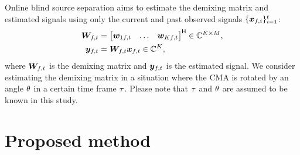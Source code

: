\documentclass[sip,biber]{now-journal}
\begin{document}
Online blind source separation aims to estimate the demixing matrix and estimated signals using only the current and past observed signals $\{\bm{x} _{f,i}\} _{i=1} ^{t}$:
\begin{align}
  \Demix _{\ft} &= \begin{bmatrix} \demix _{1\ft} & \dots & \demix _{\Src\ft} \end{bmatrix} ^{\hermite} \in \C ^{\Src \times \Mic}, \\
  \Est _{\ft} &= \Demix _{\ft} \Obs _{\ft} \in \C ^{\Src},
\end{align}
where $\Demix _{\ft}$ is the demixing matrix and $\Est _{\ft}$ is the estimated signal.
We consider estimating the demixing matrix in a situation where the CMA is rotated by an angle $\theta$ in a certain time frame $\tau$.
Please note that $\tau$ and $\theta$ are assumed to be known in this study.%

\section{Proposed method}

\end{document}
